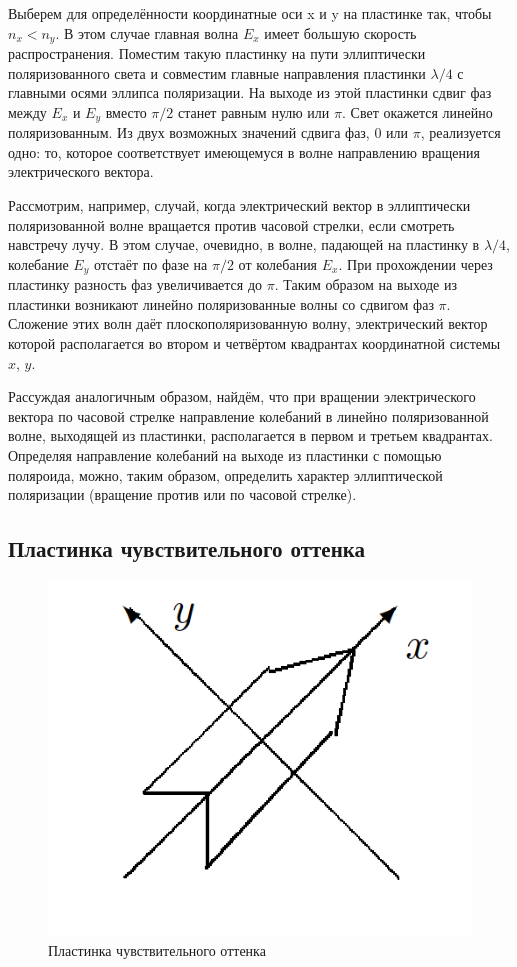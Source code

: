 \documentclass[12pt, a4paper]{article}
\begin{document}
Выберем для определённости координатные оси x и y на пластинке так, чтобы
$n_x<n_y$. В этом случае главная волна $E_x$ имеет большую скорость
распространения. Поместим такую пластинку на пути эллиптически поляризованного
света и совместим главные направления пластинки $ \lambda/4 $ с главными осями
эллипса поляризации. На выходе из этой пластинки сдвиг фаз между $E_x$ и $E_y$
вместо $\pi/2$ станет равным нулю или $\pi$. Свет окажется линейно
поляризованным. Из двух возможных значений сдвига фаз, $0$ или $\pi$,
реализуется одно: то, которое соответствует имеющемуся в волне направлению
вращения электрического вектора.

Рассмотрим, например, случай, когда электрический вектор в эллиптически
поляризованной волне вращается против часовой стрелки, если смотреть навстречу
лучу. В этом случае, очевидно, в волне, падающей на пластинку в $\lambda/4$,
колебание $E_y$ отстаёт по фазе на $\pi/2$ от колебания $E_x$. При прохождении
через пластинку разность фаз увеличивается до $\pi$. Таким образом на выходе из
пластинки возникают линейно поляризованные волны со сдвигом фаз $\pi$. Сложение
этих волн даёт плоскополяризованную волну, электрический вектор которой
располагается во втором и четвёртом квадрантах координатной системы $x$, $y$.

Рассуждая аналогичным образом, найдём, что при вращении электрического вектора
по часовой стрелке направление колебаний в линейно поляризованной волне,
выходящей из пластинки, располагается в первом и третьем квадрантах. Определяя
направление колебаний на выходе из пластинки с помощью поляроида, можно, таким
образом, определить характер эллиптической поляризации (вращение против или по
часовой стрелке).

\subsection{Пластинка чувствительного оттенка}

\begin{figure}
    \includegraphics[width=\linewidth]{pics/3.png}
    \caption{Пластинка
        чувствительного
        оттенка}
    \label{ris 3}
\end{figure}
\end{document}
